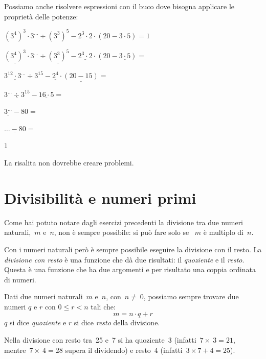 \begin{esempio}

 Possiamo anche risolvere espressioni con il buco dove bisogna
 applicare le proprietà delle potenze:
 
 \(\left(3^4 \right)^3 \cdot 3^{\dots} \div \left(3^3 \right)^5 -
  2^{3} \cdot 2 \cdot \left( 20 - 3 \cdot 5 \right) = 1\)

 \(\underline{\left(3^4 \right)^3} \cdot 
  3^{\dots} \div \underline{\left(3^3 \right)^5} -
  \underline{2^{3} \cdot 2} \cdot 
  \left( 20 - \underline{3 \cdot 5} \right) =\)

 \(\underline{3^{12} \cdot 3^{\dots}} \div 3^{15} -
  \underline{2^{4}} \cdot \underline{\left( 20 - 15 \right)} =\)

  \(\underline{3^{\dots} \div 3^{15}} -
  \underline{16 \cdot 5} =\)

  \(\underline{3^{\dots}} - 80 =\)

  \(\underline{{\dots} - 80} =\)
  
  \(1\)

  La risalita non dovrebbe creare problemi.
  
 \end{esempio}

\section{Divisibilità e numeri primi}
\label{sec:01_divsibilita}

Come hai potuto notare dagli esercizi precedenti la divisione tra due 
numeri naturali,~\(m\) e~\(n\), non è sempre possibile: si può fare solo se~
\(m\) è multiplo di~\(n\).

Con i numeri naturali però è sempre possibile eseguire la divisione con il 
resto. La \emph{divisione con resto} è una funzione che dà due risultati:
il \emph{quoziente} e il \emph{resto}. 
Questa è una funzione che ha due argomenti e per risultato una coppia 
ordinata di numeri.

\begin{definizione}
 Dati due numeri naturali~\(m\) e~\(n\), con~\(n\neq~0\), 
 possiamo sempre trovare due numeri \(q\) e \(r\) con \(0 \leqslant r < n\) 
 tali che: 
 \[m = n \cdot q + r\] 
 \(q\) si dice \emph{quoziente} e \(r\) si dice \emph{resto} della divisione.
\end{definizione}

 \begin{esempio}
 Nella divisione con resto tra~25 e~7 si ha quoziente~3 
 (infatti~\(7\times~3=21\),
 mentre~\(7\times~4=28\) supera il dividendo) e resto~4 
 (infatti~\(3 \times 7 + 4 = 25\)).

\begin{inaccessibleblock}
 
\end{inaccessibleblock}
 \end{esempio}

